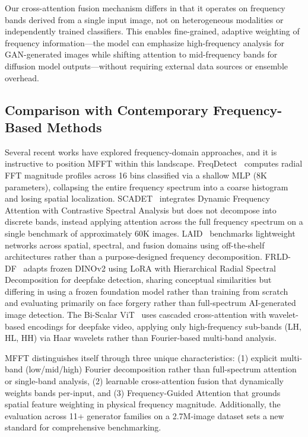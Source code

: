 \documentclass[journal]{IEEEtran}
\begin{document}
Our cross-attention fusion mechanism differs in that it operates on frequency bands derived from a single input image, not on heterogeneous modalities or independently trained classifiers. This enables fine-grained, adaptive weighting of frequency information---the model can emphasize high-frequency analysis for GAN-generated images while shifting attention to mid-frequency bands for diffusion model outputs---without requiring external data sources or ensemble overhead.

\subsection{Comparison with Contemporary Frequency-Based Methods}
Several recent works have explored frequency-domain approaches, and it is instructive to position MFFT within this landscape. FreqDetect~\cite{frank2020} computes radial FFT magnitude profiles across 16 bins classified via a shallow MLP (8K parameters), collapsing the entire frequency spectrum into a coarse histogram and losing spatial localization. SCADET~\cite{zhang2025} integrates Dynamic Frequency Attention with Contrastive Spectral Analysis but does not decompose into discrete bands, instead applying attention across the full frequency spectrum on a single benchmark of approximately 60K images. LAID~\cite{chivaran2025} benchmarks lightweight networks across spatial, spectral, and fusion domains using off-the-shelf architectures rather than a purpose-designed frequency decomposition. FRLD-DF~\cite{noureldin2026} adapts frozen DINOv2 using LoRA with Hierarchical Radial Spectral Decomposition for deepfake detection, sharing conceptual similarities but differing in using a frozen foundation model rather than training from scratch and evaluating primarily on face forgery rather than full-spectrum AI-generated image detection. The Bi-Scalar ViT~\cite{polamarasetti2026} uses cascaded cross-attention with wavelet-based encodings for deepfake video, applying only high-frequency sub-bands (LH, HL, HH) via Haar wavelets rather than Fourier-based multi-band analysis.

MFFT distinguishes itself through three unique characteristics: (1) explicit multi-band (low/mid/high) Fourier decomposition rather than full-spectrum attention or single-band analysis, (2) learnable cross-attention fusion that dynamically weights bands per-input, and (3) Frequency-Guided Attention that grounds spatial feature weighting in physical frequency magnitude. Additionally, the evaluation across 11+ generator families on a 2.7M-image dataset sets a new standard for comprehensive benchmarking.
\end{document}
